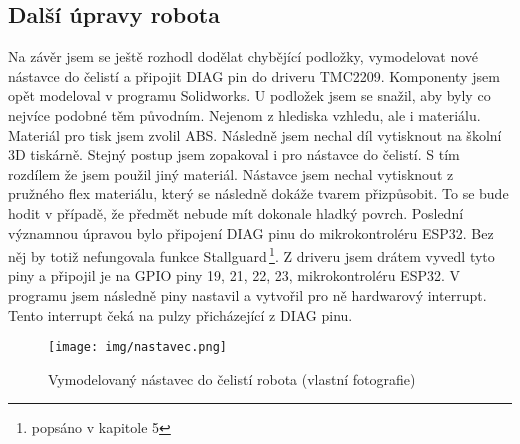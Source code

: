 \subsection{Další úpravy robota}
Na závěr jsem se ještě rozhodl dodělat chybějící podložky, vymodelovat nové nástavce do čelistí a připojit DIAG pin do driveru TMC2209. Komponenty jsem opět modeloval v programu Solidworks. U podložek jsem se snažil, aby byly co nejvíce podobné těm původním. Nejenom z hlediska vzhledu, ale i materiálu. Materiál pro tisk jsem zvolil ABS. Následně jsem nechal díl vytisknout na školní 3D tiskárně. Stejný postup jsem zopakoval i pro nástavce do čelistí. S tím rozdílem že jsem použil jiný materiál. Nástavce jsem nechal vytisknout z pružného flex materiálu, který se následně dokáže tvarem přizpůsobit. To se bude hodit v případě, že předmět nebude mít dokonale hladký povrch. Poslední významnou úpravou bylo připojení DIAG pinu do mikrokontroléru ESP32. Bez něj by totiž nefungovala funkce Stallguard\,\footnote{popsáno v kapitole 5}. Z driveru jsem drátem vyvedl tyto piny a připojil je na GPIO piny 19, 21, 22, 23, mikrokontroléru ESP32. V programu jsem následně piny nastavil a vytvořil pro ně hardwarový interrupt. Tento interrupt čeká na pulzy přicházející z DIAG pinu. \cite{BIGTREETECH-TMC2209}

	\begin{figure}
		\begin{center}
			\texttt{[image: img/nastavec.png]}
			\caption{Vymodelovaný nástavec do čelistí robota (vlastní fotografie)}
			\label{fig:nastavec}
		\end{center}
		\vspace{-7mm}
	\end{figure}



